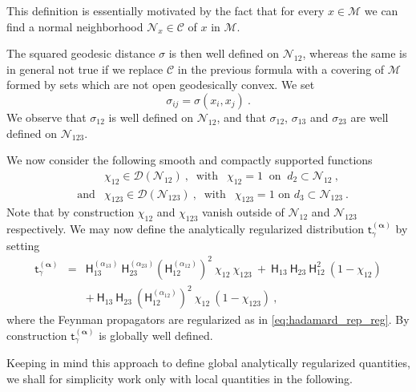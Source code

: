 \documentclass[11pt]{book}
\newcommand{\alphabd}{\boldsymbol{\alpha}}
\newcommand{\Ccal}{\mathcal{C}}
\newcommand{\Dcal}{\mathcal{D}}
\newcommand{\Mcal}{\mathcal{M}}
\newcommand{\Ncal}{\mathcal{N}}
\newcommand{\Hsf}{\mathsf{H}}
\newcommand{\tsf}{\mathsf{t}}
\theoremstyle{break}
\begin{document}
This definition is essentially motivated by the fact that for every $x \in \Mcal$ we can find a normal neighborhood $\Ncal_x \in \Ccal$ of $x$ in $\Mcal$. 



The squared geodesic distance $\sigma$ is then well defined on $\mathcal{N}_{12}$, whereas the same is in general not true if we replace $\mathcal{C}$ in the previous formula with a covering of $\mathcal{M}$ formed by sets which are not open geodesically convex. We set 
%
\begin{equation*}
\sigma_{ij} = \sigma(x_i,x_j) \ .
\end{equation*}
%
We observe that $\sigma_{12}$ is well defined on $\Ncal_{12}$, and that $\sigma_{12}$, $\sigma_{13}$ and $\sigma_{23}$ are well defined on $\Ncal_{123}$. 


We now consider the following smooth and compactly supported functions
%
\begin{eqnarray*}
&& \chi_{12} \in \Dcal(\Ncal_{12}) \ , \ \mbox{ with } \ \ \chi_{12} = 1 \ \mbox{ on } \ d_2 \subset \Ncal_{12} \ , \\[6pt]
&\mbox{and}& \chi_{123} \in \Dcal(\Ncal_{123}) \ , \ \mbox{ with } \ \ \chi_{123} = 1 \mbox{ on } d_3 \subset \Ncal_{123} \ . 
\end{eqnarray*}
%
Note that by construction $\chi_{12}$ and $\chi_{123}$ vanish outside of $\Ncal_{12}$ and $\Ncal_{123}$ respectively. We may now define the analytically regularized distribution $\tsf^{(\alphabd)}_\gamma$ by setting
%
\begin{eqnarray}
\tsf^{(\alphabd)}_\gamma &=& \Hsf^{(\alpha_{13})}_{13} \ \Hsf^{(\alpha_{23})}_{23} \left(\Hsf^{(\alpha_{12})}_{12}\right)^2 \ \chi_{12} \ \chi_{123} \ + \ \Hsf_{13} \ \Hsf_{23} \ \Hsf_{12}^2 \ (1-\chi_{12}) \nonumber \\[3pt]
&& + \ \Hsf_{13} \ \Hsf_{23} \ \left(\Hsf^{(\alpha_{12})}_{12}\right)^2 \ \chi_{12} \ (1-\chi_{123}) \ , 
\label{eq:kernel_reg_glob}
\end{eqnarray}
%
where the Feynman propagators are regularized as in \ref{eq:hadamard_rep_reg}. By construction $\tsf^{(\alphabd)}_\gamma$ is globally well defined.


Keeping in mind this approach to define global analytically regularized quantities, we shall for simplicity work only with local quantities in the following.
\end{document}
